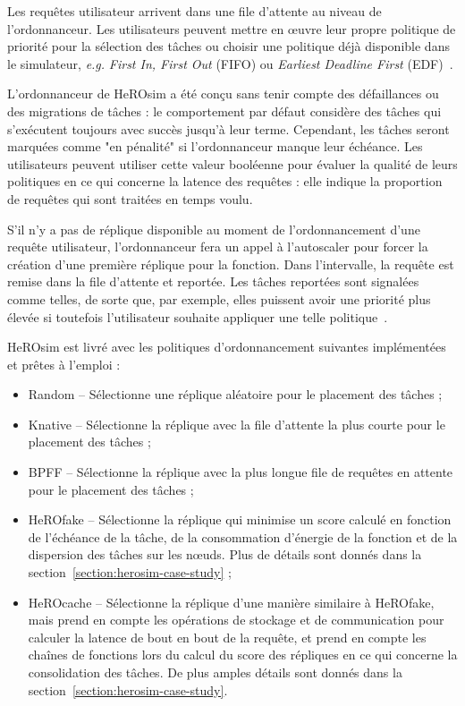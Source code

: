 Les requêtes utilisateur arrivent dans une file d'attente au niveau de l'ordonnanceur. Les utilisateurs peuvent mettre en œuvre leur propre politique de priorité pour la sélection des tâches ou choisir une politique déjà disponible dans le simulateur, \textit{e.g.} \textit{First In, First Out} (\gls{FIFO}) ou \textit{Earliest Deadline First} (\gls{EDF})~\cite{herofake}.

L'ordonnanceur de HeROsim a été conçu sans tenir compte des défaillances ou des migrations de tâches : le comportement par défaut considère des tâches qui s'exécutent toujours avec succès jusqu'à leur terme. Cependant, les tâches seront marquées comme "en pénalité" si l'ordonnanceur manque leur échéance. Les utilisateurs peuvent utiliser cette valeur booléenne pour évaluer la qualité de leurs politiques en ce qui concerne la latence des requêtes : elle indique la proportion de requêtes qui sont traitées en temps voulu.

S'il n'y a pas de réplique disponible au moment de l'ordonnancement d'une requête utilisateur, l'ordonnanceur fera un appel à l'autoscaler pour forcer la création d'une première réplique pour la fonction. Dans l'intervalle, la requête est remise dans la file d'attente et reportée. Les tâches reportées sont signalées comme telles, de sorte que, par exemple, elles puissent avoir une priorité plus élevée si toutefois l'utilisateur souhaite appliquer une telle politique~\cite{herocache}.

HeROsim est livré avec les politiques d'ordonnancement suivantes implémentées et prêtes à l'emploi :

\begin{itemize}
    \item Random -- Sélectionne une réplique aléatoire pour le placement des tâches ;
    \item Knative -- Sélectionne la réplique avec la file d'attente la plus courte pour le placement des tâches ;
    \item \gls{BPFF} -- Sélectionne la réplique avec la plus longue file de requêtes en attente pour le placement des tâches ;
    \item HeROfake -- Sélectionne la réplique qui minimise un score calculé en fonction de l'échéance de la tâche, de la consommation d'énergie de la fonction et de la dispersion des tâches sur les nœuds. Plus de détails sont donnés dans la section~\ref{section:herosim-case-study} ;
    \item HeROcache -- Sélectionne la réplique d'une manière similaire à HeROfake, mais prend en compte les opérations de stockage et de communication pour calculer la latence de bout en bout de la requête, et prend en compte les chaînes de fonctions lors du calcul du score des répliques en ce qui concerne la consolidation des tâches. De plus amples détails sont donnés dans la section~\ref{section:herosim-case-study}.
\end{itemize}

